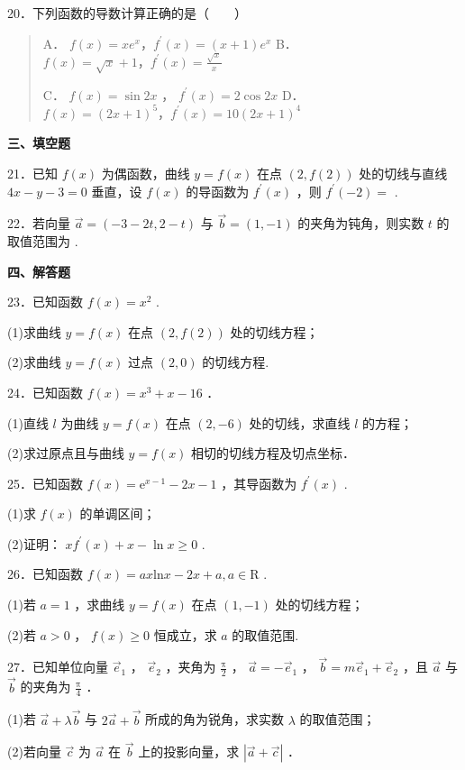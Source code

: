 20．下列函数的导数计算正确的是（~~~~）

\begin{quote}
    A． $f(x) = xe^{x}，f^{'}(x) = (x + 1)e^{x}$
    B． $f(x) = \sqrt{x} + 1，f^{'}(x) = \frac{\sqrt{x}}{x}$

    C． $f(x) = \sin 2x$ ， $f^{'}(x) = 2\cos 2x$
    D． $f(x) = (2x + 1)^{5}，f^{'}(x) = 10(2x + 1)^{4}$
\end{quote}

\textbf{三、填空题}

21．已知 $f(x)$ 为偶函数，曲线 $y = f(x)$ 在点 $\left( 2,f(2) \right)$ 处的切线与直线 $4x - y - 3 = 0$ 垂直，设 $f(x)$ 的导函数为 $f^{\prime}(x)$ ，则 $f^{\prime}( - 2) =$
.

22．若向量 $\overrightarrow{a} = ( - 3 - 2t,2 - t)$ 与 $\overrightarrow{b} = (1, - 1)$ 的夹角为钝角，则实数 $t$ 的取值范围为
.

\textbf{四、解答题}

23．已知函数 $f(x) = x^{2}$ .

(1)求曲线 $y = f(x)$ 在点 $(2,f(2))$ 处的切线方程；

(2)求曲线 $y = f(x)$ 过点 $(2,0)$ 的切线方程.

24．已知函数 $f(x) = x^{3} + x - 16$ ．

(1)直线 $l$ 为曲线 $y = f(x)$ 在点 $(2, - 6)$ 处的切线，求直线 $l$ 的方程；

(2)求过原点且与曲线 $y = f(x)$ 相切的切线方程及切点坐标．

25．已知函数 $f(x) = \text{e}^{x - 1} - 2x - 1$ ，其导函数为 $f^{'}(x)$ .

(1)求 $f(x)$ 的单调区间；

(2)证明： $xf^{\prime}(x) + x - \ln x \geq 0$ .

26．已知函数  $f(x) = ax\text{ln}x - 2x + a,a \in \text{R}$  .

(1)若  $a = 1$  ，求曲线  $y = f(x)$  在点 $(1, - 1)$ 处的切线方程；

(2)若  $a > 0$  ，  $f(x) \geq 0$  恒成立，求  $a$  的取值范围.

27．已知单位向量 ${\overrightarrow{e}}_{1}$ ， ${\overrightarrow{e}}_{2}$ ，夹角为 $\frac{\text{π}}{2}$ ， $\overrightarrow{a} = - {\overrightarrow{e}}_{1}$ ， $\overrightarrow{b} = m{\overrightarrow{e}}_{1} + {\overrightarrow{e}}_{2}$ ，且 $\overrightarrow{a}$ 与 $\overrightarrow{b}$ 的夹角为 $\frac{\text{π}}{4}$ ．

(1)若 $\overrightarrow{a} + \lambda\overrightarrow{b}$ 与 $2\overrightarrow{a} + \overrightarrow{b}$ 所成的角为锐角，求实数 $\lambda$ 的取值范围；

(2)若向量 $\overrightarrow{c}$ 为 $\overrightarrow{a}$ 在 $\overrightarrow{b}$ 上的投影向量，求 $\left| \overrightarrow{a} + \overrightarrow{c} \right|$ ．
